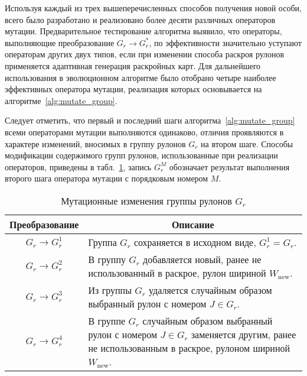 \documentclass[12pt]{article}
\newcommand\tablecaption[1]{
    \captionsetup{labelsep=newline,justification=centering}
    \caption{#1}
}
\begin{document}
Используя каждый из трех вышеперечисленных способов получения новой особи, 
всего было разработано и реализовано более десяти различных операторов мутации. 
Предварительное тестирование алгоритма выявило, что операторы, выполняющие 
преобразование $G_r \rightarrow G_r^*$, по эффективности значительно уступают 
операторам других двух типов, если при изменении способа раскроя рулонов 
применяется адаптивная генерация раскройных карт. Для дальнейшего использования 
в эволюционном алгоритме было отобрано четыре наиболее эффективных оператора 
мутации, реализация которых основывается на алгоритме~\ref{alg:mutate_group}. 

Следует отметить, что первый и последний шаги алгоритма~\ref{alg:mutate_group} 
всеми операторами мутации выполняются одинаково, отличия проявляются в характере 
изменений, вносимых в группу рулонов $G_r$ на втором шаге. Способы модификации 
содержимого групп рулонов, использованные при реализации операторов, приведены 
в табл.~\ref{tab:mutation}, 
запись $G_r^M$ обозначает результат выполнения второго шага 
оператора мутации с порядковым номером $M$.
\begin{table}[ht]
    \centering
    \tablecaption{Мутационные изменения группы рулонов $G_r$}
    \label{tab:mutation}    
    \begin{tabular}{|c|p{}|}
        \hline Преобразование & \multicolumn{1}{c|}{Описание} \\ \hline
        $G_r \rightarrow G_r^1$ & 
            Группа $G_r$ сохраняется в исходном виде, $G_r^1=G_r$. \\ \hline
        $G_r \rightarrow G_r^2$ & 
            В группу $G_r$ добавляется новый, ранее не использованный в 
            раскрое, рулон шириной $W_{\text{new}}$. \\ \hline
        $G_r \rightarrow G_r^3$ & 
            Из группы $G_r$ удаляется случайным образом выбранный рулон с 
            номером $J \in G_r$. \\ \hline
        $G_r \rightarrow G_r^4$ &
             В группе $G_r$ случайным образом выбранный рулон с номером 
             $J \in G_r$ заменяется другим, ранее не использованным в раскрое, 
             рулоном шириной $W_{\text{new}}$. \\ \hline
    \end{tabular}    
\end{table}
\end{document}
